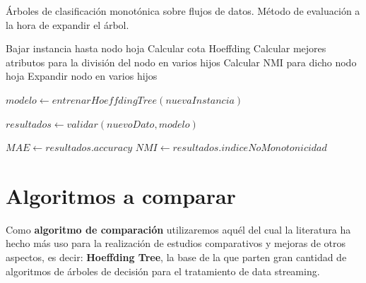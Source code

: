 \begin{algorithm}[H]
	\caption{Árboles de clasificación monotónica sobre flujos de datos. Método de evaluación a la hora de expandir el árbol.}\label{euclid}
	\begin{algorithmic}[2]
			\State Bajar instancia hasta nodo hoja
			\State Calcular cota Hoeffding
			\State Calcular mejores atributos para la división del nodo en varios hijos
			\State Calcular NMI para dicho nodo hoja
				\State Expandir nodo en varios hijos \EndIf
		\EndProcedure
		
		\State $modelo \gets entrenarHoeffdingTree(nuevaInstancia)$
		\EndWhile
		\EndProcedure
		
		\State $resultados \gets validar(nuevoDato, modelo)$
		\EndWhile
		
		\State $MAE \gets resultados.accuracy$
		\State $NMI \gets resultados.indiceNoMonotonicidad$
		
		\EndProcedure
	\end{algorithmic}
\end{algorithm}

\section{Algoritmos a comparar}

Como \textbf{algoritmo de comparación} utilizaremos aquél del cual la literatura ha hecho más uso para la realización de estudios comparativos y mejoras de otros aspectos, es decir: \textbf{Hoeffding Tree}, la base de la que parten gran cantidad de algoritmos de árboles de decisión para el tratamiento de data streaming.\\

